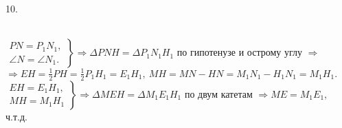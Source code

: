 10. \begin{figure}[ht!]
\end{figure}\\
$\left.\begin{array}{l}PN=P_1N_1,\\
\angle N=\angle N_1. \end{array}\right\}\Rightarrow
\Delta PNH=\Delta P_1N_1H_1\text{ по гипотенузе и острому углу }\Rightarrow $\\$\Rightarrow EH=\frac{1}{2}PH=\frac{1}{2}P_1H_1=E_1H_1,\ MH=MN-HN=M_1N_1-H_1N_1=M_1H_1.$\\
$\left.\begin{array}{l}EH=E_1H_1,\\
MH=M_1H_1  \end{array}\right\}\Rightarrow \Delta MEH=\Delta M_1E_1H_1\text{ по двум катетам }\Rightarrow ME=M_1E_1,$ ч.т.д.\\
